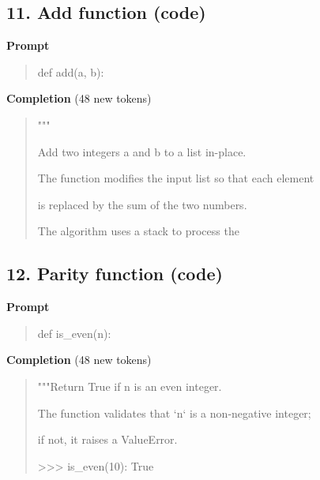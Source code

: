 \documentclass[10pt,a4paper]{article}
\begin{document}
\subsection*{11. Add function (code)}
\textbf{Prompt}\par
\begin{quote}\small\raggedright \ttfamily def add(a, b):\par\noindent [space][space][space][space]\par\end{quote}
\textbf{Completion} (48 new tokens)\par
\begin{quote}\small\raggedright \ttfamily """\par\noindent \hspace*{2.0em}Add two integers a and b to a list in-place.\par\noindent \hspace*{2.0em}The function modifies the input list so that each element\par\noindent \hspace*{2.0em}is replaced by the sum of the two numbers.\par\noindent \hspace*{2.0em}The algorithm uses a stack to process the\par\end{quote}
\filbreak
\subsection*{12. Parity function (code)}
\textbf{Prompt}\par
\begin{quote}\small\raggedright \ttfamily def is\_even(n):\par\noindent [space][space][space][space]\par\end{quote}
\textbf{Completion} (48 new tokens)\par
\begin{quote}\small\raggedright \ttfamily """Return True if n is an even integer.\par\noindent \hspace*{2.0em}The function validates that `n` is a non‑negative integer;\par\noindent \hspace*{2.0em}if not, it raises a ValueError.\par\noindent \hspace*{2.0em}>>> is\_even(10): True\par\noindent [space][space][space][space]\par\end{quote}
\filbreak
\end{document}
